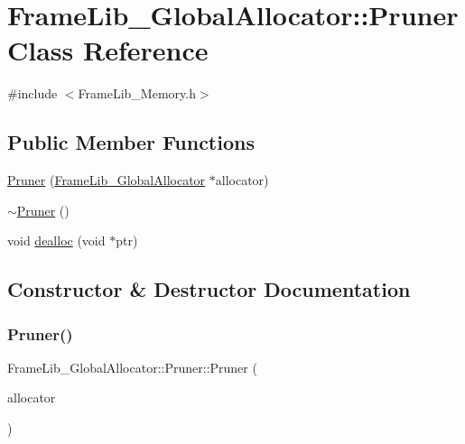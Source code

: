 \hypertarget{class_frame_lib___global_allocator_1_1_pruner}{}\section{Frame\+Lib\+\_\+\+Global\+Allocator\+:\+:Pruner Class Reference}
\label{class_frame_lib___global_allocator_1_1_pruner}


{\ttfamily \#include $<$Frame\+Lib\+\_\+\+Memory.\+h$>$}

\subsection*{Public Member Functions}
\begin{DoxyCompactItemize}
\item 
\hyperlink{class_frame_lib___global_allocator_1_1_pruner_aaeef6460d559456c61e25854f016625c}{Pruner} (\hyperlink{class_frame_lib___global_allocator}{Frame\+Lib\+\_\+\+Global\+Allocator} $\ast$allocator)
\item 
\hyperlink{class_frame_lib___global_allocator_1_1_pruner_af1b947e70e93d005e5a996ea2010e51a}{$\sim$\+Pruner} ()
\item 
void \hyperlink{class_frame_lib___global_allocator_1_1_pruner_ad261c2fb12e19ce40ed3af4c550c479c}{dealloc} (void $\ast$ptr)
\end{DoxyCompactItemize}


\subsection{Constructor \& Destructor Documentation}
\mbox{\label{class_frame_lib___global_allocator_1_1_pruner_aaeef6460d559456c61e25854f016625c}} 
\subsubsection{\texorpdfstring{Pruner()}{Pruner()}}
{\footnotesize\ttfamily Frame\+Lib\+\_\+\+Global\+Allocator\+::\+Pruner\+::\+Pruner (\begin{DoxyParamCaption}\item[{\hyperlink{class_frame_lib___global_allocator}{Frame\+Lib\+\_\+\+Global\+Allocator} $\ast$}]{allocator }\end{DoxyParamCaption})\hspace{0.3cm}{\ttfamily [inline]}}


